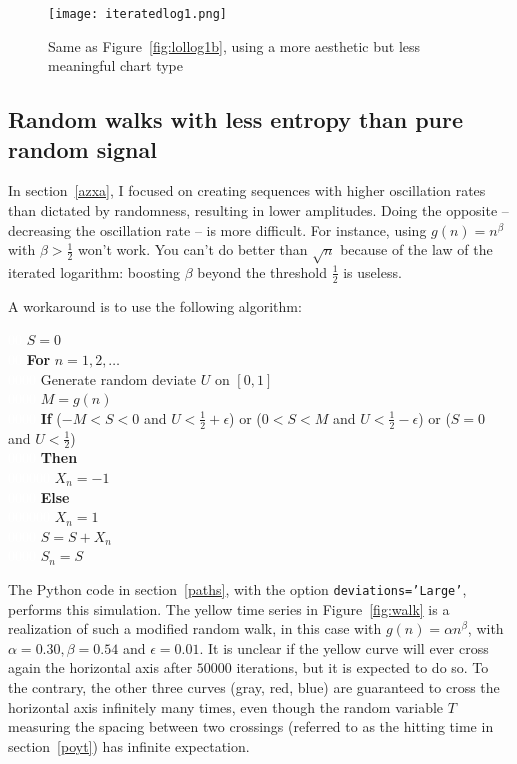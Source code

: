 \documentclass[oneside,10pt]{book}
\begin{document}
\begin{figure}%
\centering
\texttt{[image: iteratedlog1.png]}  
\caption{Same as Figure~\ref{fig:lollog1b}, using a more aesthetic but less meaningful chart type}
\label{fig:lollog1}
\end{figure}

\subsection{Random walks with less entropy than pure random signal}\label{azxb}

In section~\ref{azxa}, I focused on creating sequences with higher oscillation rates than dictated by randomness, resulting in lower amplitudes.
Doing the opposite -- decreasing the oscillation rate -- is more difficult. For instance, using $g(n)=n^\beta$ with $\beta>\frac{1}{2}$ won't work. 
 You can't do better than $\sqrt{n}$ because of the law of the iterated logarithm: boosting $\beta$ beyond the threshold $\frac{1}{2}$  is
 useless.

\noindent A workaround is to use the following algorithm: \vspace{1ex}

\noindent\textcolor{white}{00} $S=0$ \\
\textcolor{white}{00} {\bf For} $n = 1, 2,\dots$\\
\textcolor{white}{0000}  Generate random deviate $U$ on $[0,1]$\\
\textcolor{white}{0000}  $M=g(n)$\\
\textcolor{white}{0000}  {\bf If} ($-M< S< 0$ and $U < \frac{1}{2}+\epsilon$) 
or ($0<S< M$ and $U < \frac{1}{2}-\epsilon$) or ($S=0$ and $U<\frac{1}{2}$) \\ 
\textcolor{white}{0000} {\bf Then} \\
\textcolor{white}{000000} $X_n=-1$ \\
\textcolor{white}{0000} {\bf Else} \\
\textcolor{white}{000000} $X_n=1$\\
\textcolor{white}{0000} $S=S+X_n$\\
\textcolor{white}{0000} $S_n=S$ \vspace{1ex}

\noindent The Python code in section~\ref{paths}, with the option \texttt{deviations='Large'}, performs this simulation. The yellow time series in 
 Figure~\ref{fig:walk} is a realization of such a modified random walk, in this case with $g(n)=\alpha n^\beta$, with 
 $\alpha=0.30,\beta=0.54$ and $\epsilon=0.01$. It is unclear if the yellow curve will ever cross again the horizontal axis after
 $\num{50000}$ iterations, but it is expected to do so. To the contrary, the other three curves (gray, red, blue) are guaranteed to cross the
 horizontal axis infinitely many times, even though the random variable $T$ measuring the spacing between two crossings 
 (referred to as the \textcolor{index}{hitting time} in section~\ref{poyt}) has infinite expectation.
\end{document}
